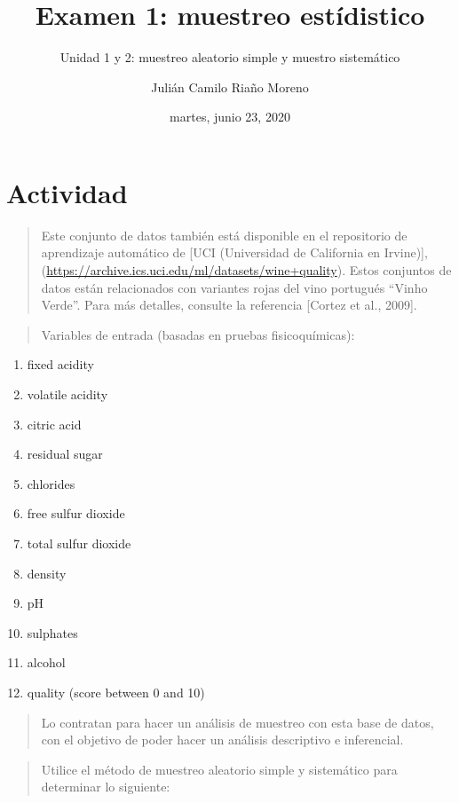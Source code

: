 \documentclass[
]{article}
\title{Examen 1: muestreo estídistico}
\subtitle{Unidad 1 y 2: muestreo aleatorio simple y muestro sistemático}
\author{Julián Camilo Riaño Moreno}
\date{martes, junio 23, 2020}
\providecommand{\tightlist}{%
  \setlength{\itemsep}{0pt}\setlength{\parskip}{0pt}}
\begin{document}
\maketitle

{
\setcounter{tocdepth}{3}
\tableofcontents
}
\hypertarget{actividad}{%
\section{Actividad}\label{actividad}}

\begin{quote}
Este conjunto de datos también está disponible en el repositorio de
aprendizaje automático de {[}UCI (Universidad de California en
Irvine){]},
(\url{https://archive.ics.uci.edu/ml/datasets/wine+quality}). Estos
conjuntos de datos están relacionados con variantes rojas del vino
portugués ``Vinho Verde''. Para más detalles, consulte la referencia
{[}Cortez et al., 2009{]}.
\end{quote}

\begin{quote}
Variables de entrada (basadas en pruebas fisicoquímicas):
\end{quote}

\begin{enumerate}
\def\labelenumi{\arabic{enumi}.}
\tightlist
\item
  fixed acidity
\item
  volatile acidity
\item
  citric acid
\item
  residual sugar
\item
  chlorides
\item
  free sulfur dioxide
\item
  total sulfur dioxide
\item
  density
\item
  pH
\item
  sulphates
\item
  alcohol
\item
  quality (score between 0 and 10)
\end{enumerate}

\begin{quote}
Lo contratan para hacer un análisis de muestreo con esta base de datos,
con el objetivo de poder hacer un análisis descriptivo e inferencial.
\end{quote}

\begin{quote}
Utilice el método de muestreo aleatorio simple y sistemático para
determinar lo siguiente:
\end{quote}
\end{document}
